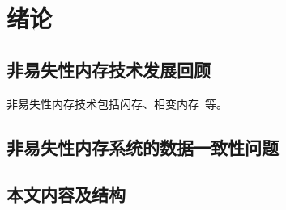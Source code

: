 \chapter{绪论}
\label{chap:intro}

\section{非易失性内存技术发展回顾}

非易失性内存技术包括闪存、相变内存~\cite{Raoux:2008:PRA}等。

\section{非易失性内存系统的数据一致性问题}

\section{本文内容及结构}

